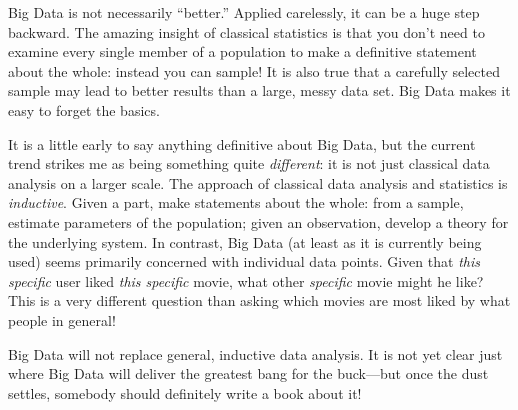 Big Data is not necessarily ``better.''  Applied carelessly, it can
be a huge step backward. The amazing insight of classical statistics
is that you don't need to examine every single member of a
population to make a definitive statement about the whole: instead
you can sample!  It is also true that a carefully selected sample
may lead to better results than a large, messy data set. Big Data
makes it easy to forget the basics.

It is a little early to say anything definitive about Big Data, but
the current trend strikes me as being something quite
\emph{different}: it is not just classical data analysis on a larger
scale.  The approach of classical data analysis and statistics is
\emph{inductive}. Given a part, make statements about the whole:
from a sample, estimate parameters of the population; given an
observation, develop a theory for the underlying system. In
contrast, Big Data (at least as it is currently being used) seems
primarily concerned with individual data points.  Given that
\emph{this specific} user liked \emph{this specific} movie, what
other \emph{specific} movie might he like?  This is a very different
question than asking which movies are most liked by what people in
general!

Big Data will not replace general, inductive data analysis. It is
not yet clear just where Big Data will deliver the greatest bang for
the buck---but once the dust settles, somebody should definitely
write a book about it!





\clearpage

\thispagestyle{empty}

\cleardoublepage
